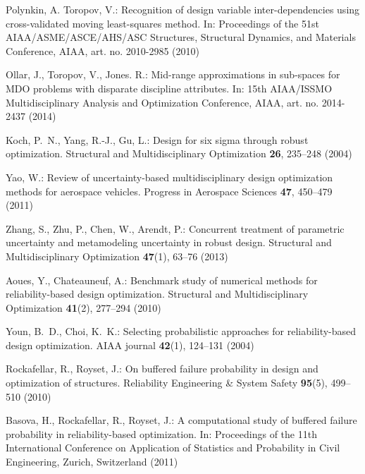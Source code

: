 \documentclass{llncs}
\begin{document}
\begin{thebibliography}{10}
Polynkin, A. Toropov, V.:
\newblock Recognition of design variable inter-dependencies using  cross-validated moving least-squares method.
\newblock In: Proceedings of the 51st AIAA/ASME/ASCE/AHS/ASC Structures, Structural Dynamics, and Materials Conference, AIAA, art. no. 2010-2985 (2010)

Ollar, J., Toropov, V., Jones. R.:
\newblock  Mid-range approximations in sub-spaces for MDO problems with disparate discipline attributes.
\newblock In: 15th AIAA/ISSMO Multidisciplinary Analysis and Optimization Conference, AIAA, art. no. 2014-2437 (2014)

Koch, P.~N., Yang, R.-J., Gu, L.:
\newblock Design for six sigma through robust optimization.
\newblock Structural and Multidisciplinary Optimization \textbf{26}, 235--248 (2004)

Yao, W.:
\newblock Review of uncertainty-based multidisciplinary design optimization methods for aerospace vehicles.
\newblock Progress in Aerospace Sciences \textbf {47}, 450--479 (2011)


Zhang, S., Zhu, P., Chen, W., Arendt, P.:
\newblock Concurrent treatment of parametric uncertainty and metamodeling uncertainty in robust design.
\newblock Structural and Multidisciplinary Optimization \textbf {47}(1), 63--76 (2013)

Aoues, Y., Chateauneuf, A.:
\newblock Benchmark study of numerical methods for reliability-based design optimization.
\newblock Structural and Multidisciplinary Optimization \textbf {41}(2), 277--294 (2010)

Youn, B.~D., Choi, K.~K.:
\newblock Selecting probabilistic approaches for reliability-based design optimization.
\newblock AIAA journal \textbf{42}(1), 124--131 (2004)

Rockafellar, R., Royset, J.:
\newblock On buffered failure probability in design and optimization of structures.
\newblock Reliability Engineering \& System Safety \textbf{95}(5), 499--510 (2010)

Basova, H., Rockafellar, R., Royset, J.:
\newblock A computational study of buffered failure probability in reliability-based optimization.
\newblock In: Proceedings of the 11th International Conference on Application of Statistics and Probability in Civil Engineering, Zurich, Switzerland (2011)


\end{thebibliography}
\end{document}
